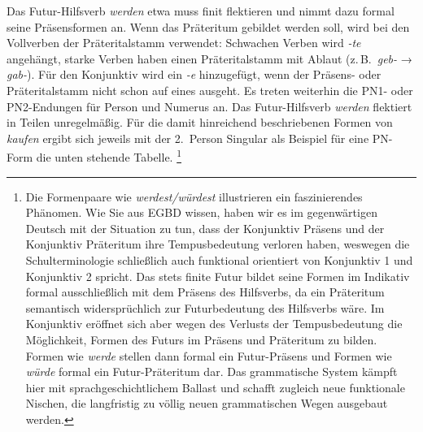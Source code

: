Das Futur-Hilfsverb \textit{werden} etwa muss finit flektieren und nimmt dazu formal seine Präsensformen an.
Wenn das Präteritum gebildet werden soll, wird bei den Vollverben der Präteritalstamm verwendet: Schwachen Verben wird \textit{-te} angehängt, starke Verben haben einen Präteritalstamm mit Ablaut (z.\,B.\ \textit{geb-} → \textit{gab-}).
Für den Konjunktiv wird ein \textit{-e} hinzugefügt, wenn der Präsens- oder Präteritalstamm nicht schon auf eines ausgeht.
Es treten weiterhin die PN1- oder PN2-Endungen für Person und Numerus an.
Das Futur-Hilfsverb \textit{werden} flektiert in Teilen unregelmäßig.
Für die damit hinreichend beschriebenen Formen von \textit{kaufen} ergibt sich jeweils mit der 2.~Person Singular als Beispiel für eine PN-Form die unten stehende Tabelle.%
\footnote{Die Formenpaare wie \textit{werdest\slash würdest} illustrieren ein faszinierendes Phänomen.
Wie Sie aus EGBD wissen, haben wir es im gegenwärtigen Deutsch mit der Situation zu tun, dass der Konjunktiv Präsens und der Konjunktiv Präteritum ihre Tempusbedeutung verloren haben, weswegen die Schulterminologie schließlich auch funktional orientiert von Konjunktiv 1 und Konjunktiv 2 spricht.
Das stets finite Futur bildet seine Formen im Indikativ formal ausschließlich mit dem Präsens des Hilfsverbs, da ein Präteritum semantisch widersprüchlich zur Futurbedeutung des Hilfsverbs wäre.
Im Konjunktiv eröffnet sich aber wegen des Verlusts der Tempusbedeutung die Möglichkeit, Formen des Futurs im Präsens und Präteritum zu bilden.
Formen wie \textit{werde} stellen dann formal ein Futur-Präsens und Formen wie \textit{würde} formal ein Futur-Präteritum dar.
Das grammatische System kämpft hier mit sprachgeschichtlichem Ballast und schafft zugleich neue funktionale Nischen, die langfristig zu völlig neuen grammatischen Wegen ausgebaut werden.}

